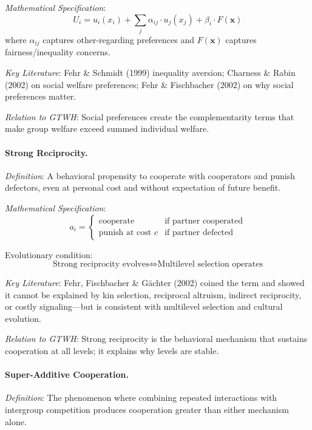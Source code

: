 \documentclass[12pt,a4paper]{article}
\begin{document}
\textit{Mathematical Specification}:
\begin{equation}
U_i = u_i(x_i) + \sum_j \alpha_{ij} \cdot u_j(x_j) + \beta_i \cdot F(\mathbf{x})
\end{equation}
where $\alpha_{ij}$ captures other-regarding preferences and $F(\mathbf{x})$ 
captures fairness/inequality concerns.

\textit{Key Literature}: Fehr \& Schmidt (1999) inequality aversion; 
Charness \& Rabin (2002) on social welfare preferences; 
Fehr \& Fischbacher (2002) on why social preferences matter.

\textit{Relation to GTWH}: Social preferences create the complementarity terms 
that make group welfare exceed summed individual welfare.

\medskip

\paragraph{Strong Reciprocity.}
\textit{Definition}: A behavioral propensity to cooperate with cooperators and 
punish defectors, even at personal cost and without expectation of future benefit.

\textit{Mathematical Specification}:
\begin{equation}
a_i = \begin{cases}
\text{cooperate} & \text{if partner cooperated} \\
\text{punish at cost } c & \text{if partner defected}
\end{cases}
\end{equation}

Evolutionary condition:
\begin{equation}
\text{Strong reciprocity evolves} \iff \text{Multilevel selection operates}
\end{equation}

\textit{Key Literature}: Fehr, Fischbacher \& Gächter (2002) coined the term 
and showed it cannot be explained by kin selection, reciprocal altruism, 
indirect reciprocity, or costly signaling---but is consistent with multilevel 
selection and cultural evolution.

\textit{Relation to GTWH}: Strong reciprocity is the behavioral mechanism that 
sustains cooperation at all levels; it explains why levels are stable.

\medskip

\paragraph{Super-Additive Cooperation.}
\textit{Definition}: The phenomenon where combining repeated interactions with 
intergroup competition produces cooperation greater than either mechanism alone.
\end{document}
